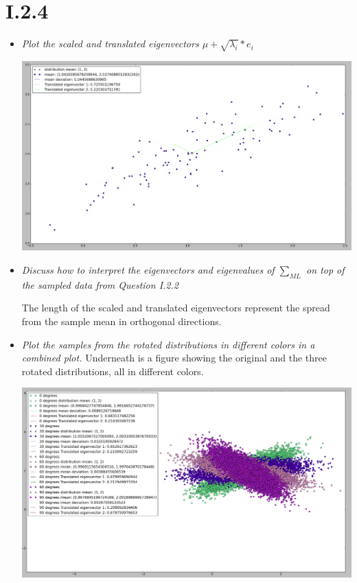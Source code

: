 \documentclass[12pt, a4paper]{article}
\begin{document}
\section{I.2.4}
\begin{itemize}
\item \textit{Plot the scaled and translated eigenvectors $\mu + \sqrt{\lambda_i} * e_i$}

\includegraphics[width=\textwidth]{5.png}

\item \textit{Discuss how to interpret the eigenvectors and eigenvalues of $\sum _{ML} $ on top of the sampled data from Question I.2.2}

The length of the scaled and translated eigenvectors represent the spread from the sample mean in orthogonal directions. 

\item \textit{Plot the samples from the rotated distributions in different colors in a combined plot.}
Underneath is a figure showing the original and the three rotated distributions, all in different colors.

\includegraphics[width=\textwidth]{6.png}


\end{itemize}
\end{document}
